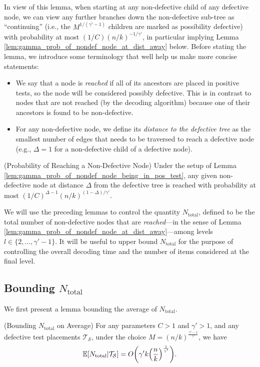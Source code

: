 In view of this lemma, when starting at any non-defective child of any defective node, we can view any further branches down the non-defective sub-tree as ``continuing'' (i.e., the $M^{1/(\gamma'-1)}$ children are marked as possibility defective) with probability at most $(1/C)(n/k)^{-1/\gamma'}$, in particular implying Lemma \ref{lem:gamma_prob_of_nondef_node_at_dist_away} below.  
% 
Before stating the lemma, we introduce some terminology that well help us make more concise statements:
\begin{itemize}
    \item We say that a node is \emph{reached} if all of its ancestors are placed in positive tests, so the node will be considered possibly defective.  This is in contrast to nodes that are not reached (by the decoding algorithm) because one of their ancestors is found to be non-defective.
    \item For any non-defective node, we define its \emph{distance to the defective tree} as the smallest number of edges that needs to be traversed to reach a defective node (e.g., $\Delta = 1$ for a non-defective child of a defective node).
\end{itemize}

\begin{lemma} \label{lem:gamma_prob_of_nondef_node_at_dist_away} \textup{(Probability of Reaching a Non-Defective Node)}
    Under the setup of Lemma \ref{lem:gamma_prob_of_nondef_node_being_in_pos_test}, any given non-defective node at distance $\Delta$ from the defective tree is reached with probability at most $(1/C)^{\Delta-1}(n/k)^{(1-\Delta)/\gamma'}$.
\end{lemma} 

We will use the preceding lemmas to control the quantity $N_{\text{total}}$, defined to be the total number of non-defective nodes that are \textit{reached}---in the sense of Lemma \ref{lem:gamma_prob_of_nondef_node_at_dist_away}---among levels $l\in\{2,\dots,\gamma'-1\}$. It will be useful to upper bound $N_{\text{total}}$ for the purpose of controlling the overall decoding time and the number of items considered at the final level.

\subsection{Bounding $N_{\text{total}}$} 

We first present a lemma bounding the average of $N_{\text{total}}$.

\begin{lemma} \label{lem:N_total_average_bound_gamma} \textup{(Bounding $N_{\text{total}}$ on Average)}
For any parameters $C>1$ and $\gamma'>1$, and any defective test placements $\mathcal{T}_{\mathcal{S}}$, under the choice $M=(n/k)^{\frac{\gamma'-1}{\gamma'}}$, we have
\begin{align}
    \mathbb{E}[N_{\textup{total}}|\mathcal{T}_{\mathcal{S}}]=O\bigg(\gamma'k\Big(\frac{n}{k}\Big)^{\frac{1}{\gamma'}}\bigg).
\end{align}
\end{lemma} 

